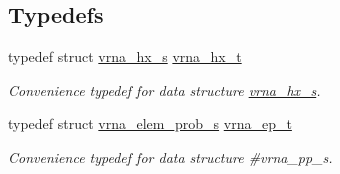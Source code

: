 \subsection*{Typedefs}
\begin{DoxyCompactItemize}
\item 
\mbox{\label{group__struct__utils_ga877363f3a1703b53ecd025c6fcf897a0}} 
typedef struct \hyperlink{group__struct__utils_structvrna__hx__s}{vrna\+\_\+hx\+\_\+s} \hyperlink{group__struct__utils_ga877363f3a1703b53ecd025c6fcf897a0}{vrna\+\_\+hx\+\_\+t}
\begin{DoxyCompactList}\small\item\em Convenience typedef for data structure \hyperlink{group__struct__utils_structvrna__hx__s}{vrna\+\_\+hx\+\_\+s}. \end{DoxyCompactList}\item 
\mbox{\label{group__struct__utils_gab9ac98ab55ded9fb90043b024b915aca}} 
typedef struct \hyperlink{group__struct__utils_structvrna__elem__prob__s}{vrna\+\_\+elem\+\_\+prob\+\_\+s} \hyperlink{group__struct__utils_gab9ac98ab55ded9fb90043b024b915aca}{vrna\+\_\+ep\+\_\+t}
\begin{DoxyCompactList}\small\item\em Convenience typedef for data structure \#vrna\+\_\+pp\+\_\+s. \end{DoxyCompactList}\end{DoxyCompactItemize}
